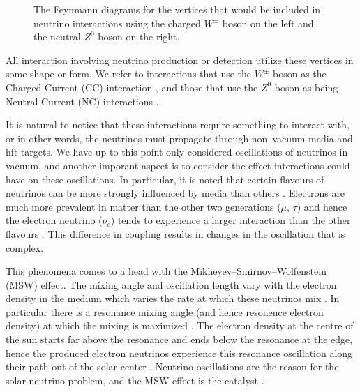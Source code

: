 \begin{figure}
  \centering
  \hspace{2em}
  \caption{The Feynmann diagrams for the vertices that would be included in neutrino interactions using the charged $W^{\pm}$ boson on the left and the neutral $Z^{0}$ boson on the right.}
  \label{fig:nvert}
\end{figure}

All interaction involving neutrino production or detection utilize these vertices in some shape or form. We refer to interactions that use the $W^{\pm}$ boson as the Charged Current (CC) interaction \cite{currents}, and those that use the $Z^{0}$ boson as being Neutral Current (NC) interactions \cite{currents}.

It is natural to notice that these interactions require something to interact with, or in other words, the neutrinos must propagate through non--vacuum media and hit targets. We have up to this point only considered oscillations of neutrinos in vacuum, and another imporant aspect is to consider the effect interactions could have on these oscillations. In particular, it is noted that certain flavours of neutrinos can be more strongly influenced by media than others \cite{solar_nu,msw}. Electrons are much more prevalent in matter than the other two generations ($\mu,\,\tau$) and hence the electron neutrino ($\nu_{e}$) tends to experience a larger interaction than the other flavours \cite{solar_nu,msw}. This difference in coupling results in changes in the oscillation that is complex.

This phenomena comes to a head with the Mikheyev–Smirnov–Wolfenstein (MSW) effect. The mixing angle and oscillation length vary with the electron density in the medium which varies the rate at which these neutrinos mix \cite{solar_nu,msw}. In particular there is a resonance mixing angle (and hence resonence electron density) at which the mixing is maximized \cite{solar_nu,msw}. The electron density at the centre of the sun starts far above the resonance and ends below the resonance at the edge, hence the produced electron neutrinos experience this resonance oscillation along their path out of the solar center \cite{solar_nu,msw}. Neutrino oscillations are the reason for the solar neutrino problem, and the MSW effect is the catalyst \cite{solar_nu}.

